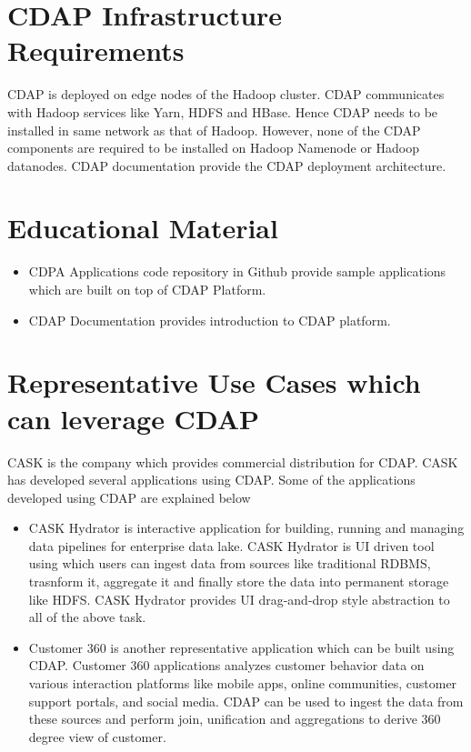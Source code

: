 \documentclass[9pt,twocolumn,twoside]{styles/osajnl}
\begin{document}
\section{CDAP Infrastructure Requirements}

CDAP is deployed on edge nodes of the Hadoop cluster. CDAP communicates with
Hadoop services like Yarn, HDFS and HBase. Hence CDAP needs to be installed
in same network as that of Hadoop. However, none of the CDAP components are
required to be installed on Hadoop Namenode or Hadoop datanodes. CDAP
documentation \cite{www-cdap-deployment} provide the CDAP deployment
architecture.

\section{Educational Material}

\begin{itemize}
\item CDPA Applications code repository in Github \cite{github-cdap-apps}
provide sample applications which are built on top of CDAP Platform.
\item CDAP Documentation \cite{www-cdap-getting-started} provides introduction
 to CDAP platform.
\end{itemize}

\section{Representative Use Cases which can leverage CDAP}

CASK \cite{www-cask-io} is the company which provides commercial distribution
for CDAP. CASK has developed several applications using CDAP.
Some of the applications developed using CDAP are explained below
\begin{itemize}
\item CASK Hydrator \cite{www-cask-hydrator} is interactive application for
building, running and managing data pipelines for enterprise data lake.
CASK Hydrator is UI driven tool using which users can ingest data from
sources like traditional RDBMS, trasnform it,
aggregate it and finally store the data into permanent storage like HDFS.
CASK Hydrator provides UI drag-and-drop style abstraction to all of the above
 task.
\item Customer 360 is another representative application which can be built
using CDAP. Customer 360 applications analyzes
customer behavior data on various interaction platforms like mobile apps,
online communities, customer support portals,
and social media. CDAP can be used to ingest the data from these sources and
perform join, unification and aggregations to derive 360 degree view of
customer.
\end{itemize}
\end{document}
